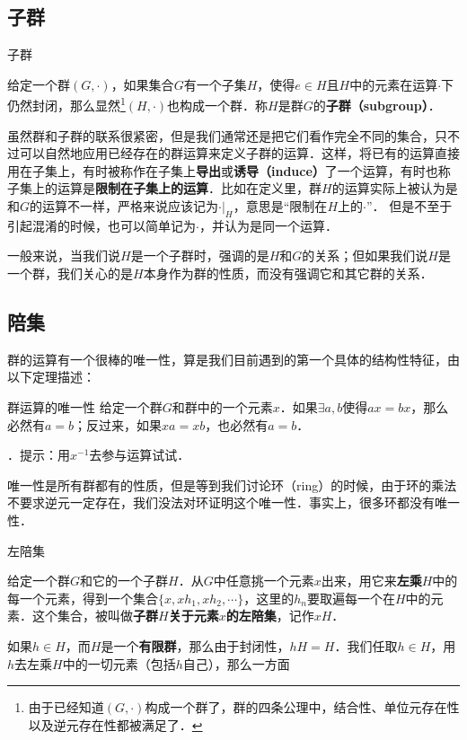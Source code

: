 
\subsection{子群}

\begin{definition}{子群}

给定一个群$(G, \cdot)$，如果集合$G$有一个子集$H$，使得$e\in H$且$H$中的元素在运算$\cdot$下仍然封闭，那么显然\footnote{由于已经知道$(G,\cdot)$构成一个群了，群的四条公理中，结合性、单位元存在性以及逆元存在性都被满足了．}$(H,\cdot)$也构成一个群．称$H$是群$G$的\textbf{子群（subgroup）}．

\end{definition}

虽然群和子群的联系很紧密，但是我们通常还是把它们看作完全不同的集合，只不过可以自然地应用已经存在的群运算来定义子群的运算．这样，将已有的运算直接用在子集上，有时被称作在子集上\textbf{导出}或\textbf{诱导（induce）}了一个运算，有时也称子集上的运算是\textbf{限制在子集上的运算}．比如在定义里，群$H$的运算实际上被认为是和$G$的运算不一样，严格来说应该记为$\cdot|_H$，意思是“限制在$H$上的$\cdot$”． 但是不至于引起混淆的时候，也可以简单记为$\cdot$，并认为是同一个运算．

一般来说，当我们说$H$是一个子群时，强调的是$H$和$G$的关系；但如果我们说$H$是一个群，我们关心的是$H$本身作为群的性质，而没有强调它和其它群的关系．

\subsection{陪集}

群的运算有一个很棒的唯一性，算是我们目前遇到的第一个具体的结构性特征，由以下定理描述：

\begin{exercise}{群运算的唯一性}\label{Group1_exe1}
给定一个群$G$和群中的一个元素$x$．如果$\exists a, b$使得$ax=bx$，那么必然有$a=b$；反过来，如果$xa=xb$，也必然有$a=b$．

\begin{itemize}
．提示：用$x^{-1}$去参与运算试试．
\end{itemize}
\end{exercise}

唯一性是所有群都有的性质，但是等到我们讨论环（ring）的时候，由于环的乘法不要求逆元一定存在，我们没法对环证明这个唯一性．事实上，很多环都没有唯一性．




\begin{definition}{左陪集}

给定一个群$G$和它的一个子群$H$．从$G$中任意挑一个元素$x$出来，用它来\textbf{左乘}$H$中的每一个元素，得到一个集合$\{x, xh_1, xh_2, \cdots\}$，这里的$h_n$要取遍每一个在$H$中的元素．这个集合，被叫做\textbf{子群$H$关于元素$x$的左陪集}，记作$xH$． 

\end{definition}

如果$h\in H$，而$H$是一个\textbf{有限群}，那么由于封闭性，$hH=H$．我们任取$h\in H$，用$h$去左乘$H$中的一切元素（包括$h$自己），那么一方面